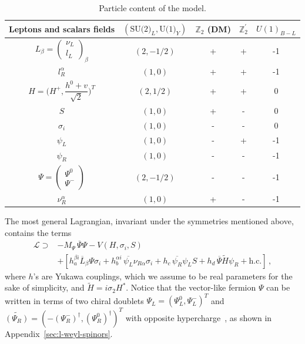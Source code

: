 \documentclass[12pt,letterpaper]{article}
\begin{document}
\begin{table}
\centering
\begin{tabular}{|c|c|c|c|c|}
\hline
Leptons and scalars fields & $(\text{SU(2)}_L, \text{U(1)}_Y)$ & $\mathbb{Z}_2$ (DM) 
& $\mathbb{Z}_2^{'}$ & $U(1)_{B-L}$\\
\hline
$L_\beta=\begin{pmatrix}
 \nu_L \\ l_L
\end{pmatrix}_{\beta}$ &$(2,-1/2)$&+&+ &-1\\
$l_R^\alpha$ &$(1,0)$&+&+& -1\\
$H=\bigg( H^+, \dfrac{h^0+v}{\sqrt{2}}\bigg)^T$ & $(2,1/2)$ & + & + & 0\\
\hline
$S$ & $(1,0)$ & + & - & 0\\
$\sigma_i$ & $(1,0)$ & - & - & 0\\
\hline
$\psi_{L}$ & $(1,0)$ & - & + & -1\\
$\psi_{R}$ & $(1,0)$ & - & - & -1\\
$\Psi=\begin{pmatrix}
\Psi^0 \\ \Psi^-
\end{pmatrix}$ & $(2,-1/2)$ & - & - & -1\\
$\nu_{R }^\alpha$ & $(1,0)$ & + & - & -1\\
 \hline
\end{tabular}
\caption{Particle content of the model. }
\label{tab:particle-content-Dirac}
\end{table}
The most general Lagrangian, invariant under the symmetries mentioned above, contains the terms
\begin{align}
\label{eq:full-lagrangian-Dirac}
\mathcal{L} \supset &
-M_{\Psi}\, \overline{\Psi}\Psi -V(H,\sigma_i, S)\nonumber  \\
&+  \left[ h_a^{\beta i} \overline{L}_\beta \Psi \sigma_i 
+ h_b^{\alpha i}\, \overline{{\psi}_{L}} \nu_{R\alpha} \sigma_i
+ h_c\, \overline{{\psi}_{R}}\psi_{L} S 
+ h_d\,\overline{\Psi}\widetilde{H}\psi_{R} 
+ \text{h.c.}\right] \,, 
\end{align}
where $h$'s are Yukawa couplings, which we assume to be real parameters for the sake of simplicity, and $\widetilde{H}=i\sigma_2 H^*$. 
Notice that the vector-like fermion $\Psi$ can be written in terms of two chiral doublets $\Psi_L=(\Psi_L^0,\Psi_L^-)^T$ and $\widetilde{(\Psi_R)}=(-(\Psi_R^-)^{\dagger},(\Psi_R^0)^{\dagger})^T$ with opposite hypercharge~\cite{Calle:2018ovc}, as shown in Appendix~\ref{sec:l-weyl-spinors}. 
\end{document}
